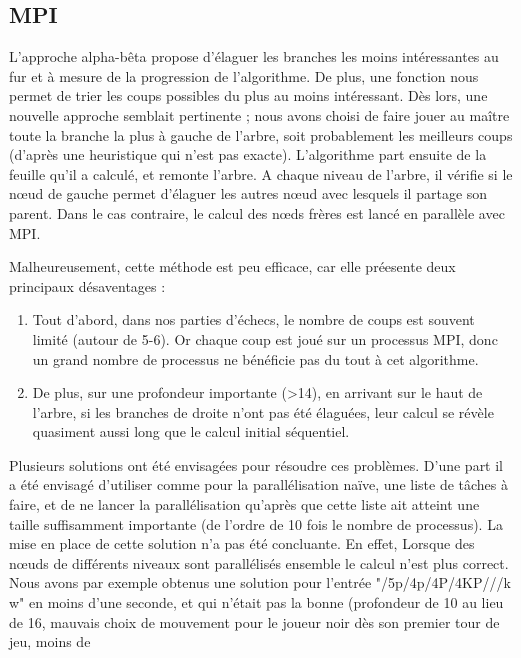 \documentclass[12pt]{article}
\begin{document}
    \subsection{MPI}
    L'approche alpha-bêta propose d'élaguer les branches
    les moins intéressantes au fur et à mesure de la progression de 
    l'algorithme. De plus, une fonction nous permet de trier les coups
    possibles du plus au moins intéressant. Dès lors, une nouvelle 
    approche semblait pertinente ; nous avons choisi de faire jouer au
    maître toute la branche la plus à gauche de l'arbre, soit
    probablement les meilleurs coups (d'après une heuristique qui n'est pas 
    exacte). L'algorithme part ensuite de la feuille qu'il a calculé, et
    remonte l'arbre. A chaque niveau de l'arbre, il vérifie si le n\oe ud de 
    gauche permet d'élaguer les autres n\oe ud avec lesquels il partage
    son parent. Dans le cas contraire, le calcul des \og n\oe ds frères \fg
    est lancé en parallèle avec MPI.\\
    \par Malheureusement, cette méthode est peu efficace, car elle préesente
    deux principaux désaventages :
    \begin{enumerate}
        \item Tout d'abord, dans nos parties d'échecs, le nombre
    de coups est souvent limité (autour de 5-6). Or chaque coup est joué sur un
    processus MPI, donc un grand nombre de processus ne bénéficie pas du tout
    à cet algorithme.
        \item De plus, sur une profondeur importante (>14),
    en arrivant sur le haut de l'arbre, si les branches de droite n'ont pas
    été élaguées, leur calcul se révèle quasiment aussi long que le calcul
    initial séquentiel. 
    \end{enumerate}
    Plusieurs solutions ont été envisagées pour résoudre ces problèmes.
    D'une part il a été envisagé d'utiliser comme pour la parallélisation
    naïve, une liste de tâches à faire, et de ne lancer la parallélisation
    qu'après que cette liste ait atteint une taille suffisamment importante
    (de l'ordre de 10 fois le nombre de processus).
    La mise en place de cette solution n'a pas été concluante. En effet,
    Lorsque des n\oe uds de différents niveaux sont parallélisés ensemble
    le calcul n'est plus correct. Nous avons par exemple obtenus une solution
    pour l'entrée "/5p/4p/4P/4KP///k w" en moins d'une seconde, et qui
    n'était pas la bonne (profondeur de 10 au lieu de 16, mauvais choix de
    mouvement pour le joueur noir dès son premier tour de jeu, moins de
\end{document}
